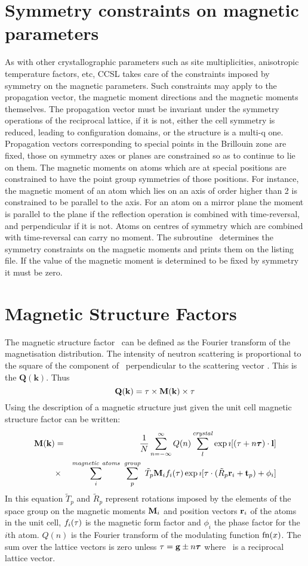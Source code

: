 \section{Symmetry constraints on magnetic parameters}
As with other crystallographic parameters such as site multiplicities, anisotropic
temperature factors, etc, CCSL takes care of the constraints imposed by symmetry on
the magnetic parameters. Such constraints may apply to the propagation vector, the
magnetic moment directions and the magnetic moments themselves. The propagation vector
must be invariant under the symmetry operations of the reciprocal lattice, if it is
not, either the cell symmetry is reduced, leading to configuration domains, or the
structure is a multi-q one. Propagation vectors corresponding to special points in the
Brillouin zone are fixed, those on symmetry  axes or planes are constrained so as to
continue to lie on them. The magnetic moments on atoms which are at special positions
are constrained to have the point group symmetries of those positions. For instance,
the magnetic moment of  an atom which lies on an axis of order higher than 2 is
constrained to be parallel to the axis. For an atom on a mirror plane the moment is
parallel to the plane if the reflection operation is combined with time-reversal, and
perpendicular if it is not. Atoms on centres of symmetry which are combined with
time-reversal can carry no moment. The subroutine \ determines the
symmetry constraints on the magnetic  moments and prints them on the listing file. If
the value of the magnetic moment is determined to be fixed by symmetry it must be
zero.
\p
\p 
\section{Magnetic Structure Factors}
The magnetic structure factor \Mk\ can be defined as 
the Fourier transform of
the magnetisation distribution.\p
The intensity of neutron scattering is proportional to the square
of the component of \Mk\ perpendicular to the scattering
vector \kv. This is the  $\mathbf{Q(k)}$. Thus
\[\mbox{$\mathbf{Q(k)}$}=\mbox{$\bf \tau$}\times\mbox{$\mathbf{M(k)}$}\times\mbox{$\bf \tau$}\]
Using the description of a magnetic structure just given the unit cell magnetic 
structure factor can be written:
\begin{eqnarray*}
\Mk & = &\frac1N\sum_{n=-\infty}^\infty Q(n) \sum_l^{\mathit{crystal}}
\exp \imath[(\kv+n\pv)\cdot\lat]\\
&\times&\sum_i^{\mathit{magnetic\ atoms}}\ \sum_p^{\mathit{group}}
\ \tilde T_p{\bf M}_{i}
f_i(\kv)\exp \imath[\kv\cdot(\tilde R_p{\bf r}_i+{\bf t}_p)+\phi_i]
\end{eqnarray*}
In this equation 
$\tilde T_p$ and $\tilde R_p$ represent rotations imposed by the elements of the space group on the magnetic 
moments ${\bf M}_i$ and position vectors $\mbox{$\bf r$}_i$ of the atoms in the unit cell, $f_i(\mbox{$\bf \tau$})$ is the magnetic form factor 
and $\phi_i$ the phase factor for the $i$th atom. $Q(n)$ is  the Fourier transform of the
modulating function $\mbox{\rm fn}(x)$. The sum over the lattice vectors is
zero unless $\mbox{$\bf \tau$}=\mbox{$\bf g$}\pm n{\bm \tau}$ where \rl\ is a  reciprocal lattice vector. 


